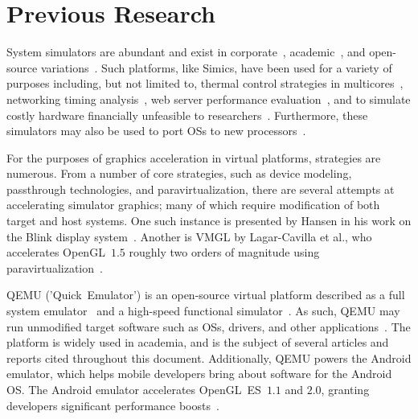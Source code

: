 
\section{Previous Research}
\label{sec:previousresearch}
System simulators are abundant and exist in corporate~, academic~, and open-source variations~.
Such platforms, like Simics, have been used for a variety of purposes including, but not limited to, thermal control strategies in multicores~, networking timing analysis~, web server performance evaluation~, and to simulate costly hardware financially unfeasible to researchers~.
Furthermore, these simulators may also be used to port OSs to new processors~.

For the purposes of graphics acceleration in virtual platforms, strategies are numerous.
From a number of core strategies, such as device modeling, passthrough technologies, and paravirtualization, there are several attempts at accelerating simulator graphics; many of which require modification of both target and host systems.
One such instance is presented by Hansen in his work on the Blink display system~.
Another is VMGL by Lagar-Cavilla et al., who accelerates OpenGL~$1.5$ roughly two orders of magnitude using paravirtualization~.

QEMU ('Quick~Emulator') is an open-source virtual platform described as a full system emulator~ and a high-speed functional simulator~.
As such, QEMU may run unmodified target software such as OSs, drivers, and other applications~.
The platform is widely used in academia, and is the subject of several articles and reports cited throughout this document.
Additionally, QEMU powers the Android emulator, which helps mobile developers bring about software for the Android OS.
The Android emulator accelerates OpenGL~ES~$1.1$ and $2.0$, granting developers significant performance boosts~.

